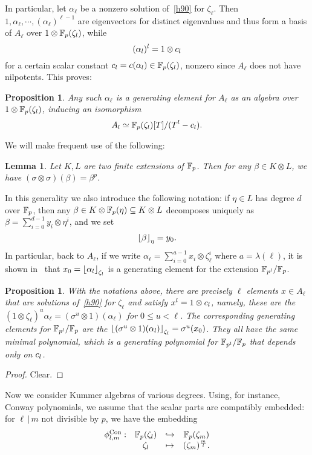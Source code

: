 \documentclass{sig-alternate}
\newtheorem{proposition}[theorem]{Proposition}
\newtheorem{lemma}[theorem]{Lemma}
\begin{document}
In particular, let $\alpha_\ell$ be a nonzero solution of~\eqref{h90} for $\zeta_\ell$.
Then $1,\alpha_\ell,\cdots,(\alpha_\ell)^{\ell-1}$ are eigenvectors for distinct eigenvalues and thus
form a basis of $A_\ell$ over $1\otimes\mathbb{F}_{p}(\zeta_{l})$,
while
\[ (\alpha_l)^l = 1\otimes c_l \]
for a certain scalar constant $c_l=c(\alpha_l)\in\mathbb{F}_{p}(\zeta_l)$,
nonzero since $A_\ell$ does not have nilpotents.
This proves:
\begin{proposition}
\label{alphagen}
Any such $\alpha_\ell$ is a generating element for $A_\ell$ as an algebra over $1\otimes\mathbb{F}_{p}(\zeta_{l})$,
inducing an isomorphism
\[ A_l\simeq \mathbb{F}_{p}(\zeta_{l})[T]/(T^l-c_l). \]
\end{proposition}

We will make frequent use of the following:
\begin{lemma}
\label{FrobFrob}
Let $K,L$ are two finite extensions of $\mathbb{F}_{p}$.
Then for any $\beta\in K\otimes L$,
we have $(\sigma\otimes\sigma)(\beta)=\beta^p$.
\end{lemma}
In this generality we also introduce the following notation: if $\eta\in L$ has degree $d$ over $\mathbb{F}_{p}$,
then any $\beta\in K\otimes\mathbb{F}_{p}(\eta)\subseteq K\otimes L$ decomposes uniquely as $\beta = \sum_{i =  0}^{d-1}y_i\otimes\eta^i$,
and we set  \[ \left\lfloor \beta \right\rfloor_{\eta}=y_0. \]
In particular, back to $A_\ell$, if we write
$\alpha_\ell = \sum_{i =  0}^{a-1}x_i\otimes\zeta_{\ell}^i$ where $a=\lambda(\ell)$,
it is shown in~\cite{Allombert02} that $x_0=\left\lfloor \alpha_l \right\rfloor_{\zeta_l}$ is a generating element for the extension
$\mathbb{F}_{p^l}/\mathbb{F}_{p}$.

\begin{proposition}
\label{depend}
With the notations above, there are precisely $\ell$ elements $x\in A_\ell$ that are solutions of~\eqref{h90} for $\zeta_\ell$
and satisfy $x^l=1\otimes c_l$, namely, these are the $(1\otimes\zeta_\ell)^u\alpha_\ell=(\sigma^u\otimes 1)(\alpha_\ell)$
for $0\leq u<\ell$.
The corresponding generating elements for $\mathbb{F}_{p^l}/\mathbb{F}_{p}$ are the $\left\lfloor (\sigma^u\otimes 1)(\alpha_l) \right\rfloor_{\zeta_l}=\sigma^u(x_0)$.
They all have the same minimal polynomial, which is a generating polynomial for $\mathbb{F}_{p^l}/\mathbb{F}_{p}$ that depends only on $c_l$.
\end{proposition}
\begin{proof}
Clear.
\end{proof}

Now we consider Kummer algebras of various degrees.
Using, for instance, Conway polynomials, we assume that the scalar parts are compatibly embedded:
for $\ell\,|\,m$ not divisible by $p$, we have the embedding
\[
\begin{array}{cccc}
  {\phi^{\textrm{Con}}_{{l},{m}}}: & \mathbb{F}_{p}(\zeta_l) & \hookrightarrow & \mathbb{F}_{p}(\zeta_m) \\
  & \zeta_l & \mapsto & (\zeta_{m})^{\frac{m}{l}}.
\end{array}
\]
\end{document}
